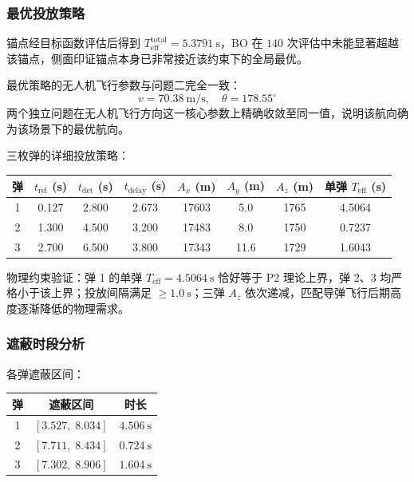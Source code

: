 \documentclass{ctexart}
\begin{document}
\subsubsection{最优投放策略}

锚点经目标函数评估后得到 $T_{\text{eff}}^{\text{total}} = 5.3791\ \mathrm{s}$，BO 在 $140$ 次评估中未能显著超越该锚点，侧面印证锚点本身已非常接近该约束下的全局最优。

最优策略的无人机飞行参数与问题二完全一致：
\[
\boxed{v = 70.38\ \mathrm{m/s},\quad \theta = 178.55^\circ}
\]
两个独立问题在无人机飞行方向这一核心参数上精确收敛至同一值，说明该航向确为该场景下的最优航向。

三枚弹的详细投放策略：

\begin{center}
\begin{tabular}{c|c|c|c|c|c|c|c}
\toprule
\textbf{弹} & $t_{\text{rel}}$ (s) & $t_{\text{det}}$ (s) & $t_{\text{delay}}$ (s) & $A_x$ (m) & $A_y$ (m) & $A_z$ (m) & 单弹 $T_{\text{eff}}$ (s) \\
\midrule
1 & 0.127 & 2.800 & 2.673 & 17603 & 5.0 & 1765 & 4.5064 \\
2 & 1.300 & 4.500 & 3.200 & 17483 & 8.0 & 1750 & 0.7237 \\
3 & 2.700 & 6.500 & 3.800 & 17343 & 11.6 & 1729 & 1.6043 \\
\bottomrule
\end{tabular}
\end{center}

物理约束验证：弹 1 的单弹 $T_{\text{eff}} = 4.5064\ \mathrm{s}$ 恰好等于 P2 理论上界，弹 2、3 均严格小于该上界；投放间隔满足 $\geq 1.0\ \mathrm{s}$；三弹 $A_z$ 依次递减，匹配导弹飞行后期高度逐渐降低的物理需求。

\subsubsection{遮蔽时段分析}

各弹遮蔽区间：

\begin{center}
\begin{tabular}{c|c|c}
\toprule
\textbf{弹} & \textbf{遮蔽区间} & \textbf{时长} \\
\midrule
1 & $[3.527,\; 8.034]$ & $4.506\ \mathrm{s}$ \\
2 & $[7.711,\; 8.434]$ & $0.724\ \mathrm{s}$ \\
3 & $[7.302,\; 8.906]$ & $1.604\ \mathrm{s}$ \\
\bottomrule
\end{tabular}
\end{center}
\end{document}
